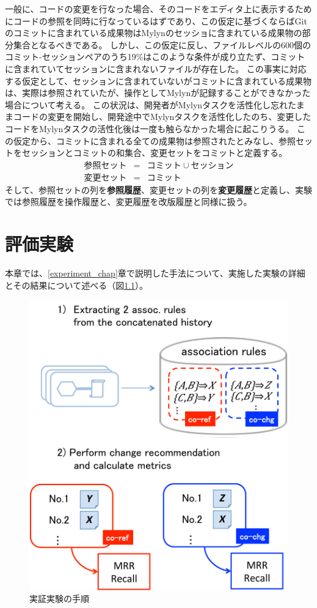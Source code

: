 \documentclass[a4paper]{jsbook}
\begin{document}
一般に、コードの変更を行なった場合、そのコードをエディタ上に表示するためにコードの参照を同時に行なっているはずであり、この仮定に基づくならばGitのコミットに含まれている成果物はMylynのセッショに含まれている成果物の部分集合となるべきである。
しかし、この仮定に反し、ファイルレベルの600個のコミット-セッションペアのうち19\%はこのような条件が成り立たず、コミットに含まれていてセッションに含まれないファイルが存在した。
この事実に対応する仮定として、セッションに含まれていないがコミットに含まれている成果物は、実際は参照されていたが、操作としてMylynが記録することができなかった場合について考える。
この状況は、開発者がMylynタスクを活性化し忘れたままコードの変更を開始し、開発途中でMylynタスクを活性化したのち、変更したコードをMylynタスクの活性化後は一度も触らなかった場合に起こりうる。
この仮定から、コミットに含まれる全ての成果物は参照されたとみなし、参照セットをセッションとコミットの和集合、変更セットをコミットと定義する。
\begin{eqnarray}
  参照セット &=& コミット \cup セッション\\
  変更セット &=&  コミット
\end{eqnarray}
そして、参照セットの列を{\bf 参照履歴}、変更セットの列を{\bf 変更履歴}と定義し、実験では参照履歴を操作履歴と、変更履歴を改版履歴と同様に扱う。


\chapter{評価実験}\label{result_chap}
本章では、\ref{experiment_chap}章で説明した手法について、実施した実験の詳細とその結果について述べる（図\ref{procedure}）。

\begin{figure}[tb]
  \centering
  \includegraphics[width = 0.7\linewidth]{resource/procedure.pdf}
  \caption{実証実験の手順}
  \label{procedure}
\end{figure}
\end{document}
